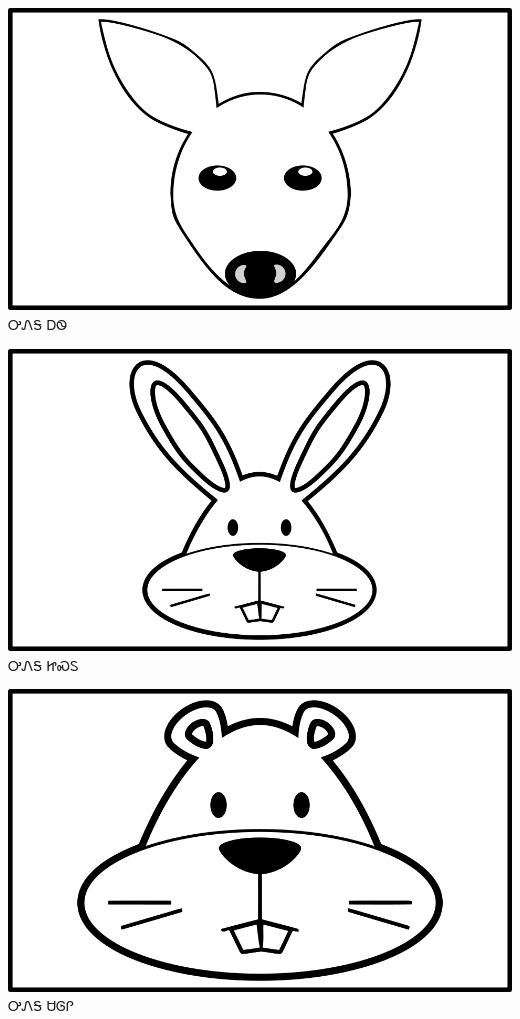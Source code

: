\documentclass[avery5371]{flashcards}%
\begin{document}
    \begin{flashcard}{
        \includegraphics[width=0.95\columnwidth,height=.51\columnwidth,keepaspectratio]{../artwork/objects-animate/ahwi}
    }
        \Huge ᎤᏁᎦ ᎠᏫ
    \end{flashcard}

    \begin{flashcard}{
        \includegraphics[width=0.95\columnwidth,height=.51\columnwidth,keepaspectratio]{../artwork/objects-animate/jisdu}
    }
        \Huge ᎤᏁᎦ ᏥᏍᏚ
    \end{flashcard}

    \begin{flashcard}{
        \includegraphics[width=0.95\columnwidth,height=.51\columnwidth,keepaspectratio]{../artwork/objects-animate/saloli}
    }
        \Huge ᎤᏁᎦ ᏌᎶᎵ
    \end{flashcard}
\end{document}
